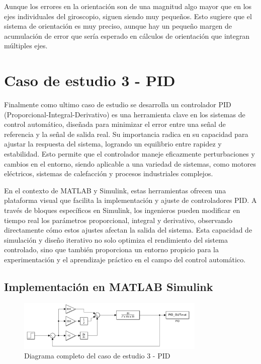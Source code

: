 Aunque los errores en la orientación son de una magnitud algo mayor que en los ejes individuales del giroscopio, siguen siendo muy pequeños. Esto sugiere que el sistema de orientación es muy preciso, aunque hay un pequeño margen de acumulación de error que sería esperado en cálculos de orientación que integran múltiples ejes. 


\section{Caso de estudio 3 - PID}

Finalmente como ultimo caso de estudio se desarrolla un controlador PID (Proporcional-Integral-Derivativo) es una herramienta clave en los sistemas de control automático, diseñada para minimizar el error entre una señal de referencia y la señal de salida real. Su importancia radica en su capacidad para ajustar la respuesta del sistema, logrando un equilibrio entre rapidez y estabilidad. Esto permite que el controlador maneje eficazmente perturbaciones y cambios en el entorno, siendo aplicable a una variedad de sistemas, como motores eléctricos, sistemas de calefacción y procesos industriales complejos.

En el contexto de MATLAB y Simulink, estas herramientas ofrecen una plataforma visual que facilita la implementación y ajuste de controladores PID. A través de bloques específicos en Simulink, los ingenieros pueden modificar en tiempo real los parámetros proporcional, integral y derivativo, observando directamente cómo estos ajustes afectan la salida del sistema. Esta capacidad de simulación y diseño iterativo no solo optimiza el rendimiento del sistema controlado, sino que también proporciona un entorno propicio para la experimentación y el aprendizaje práctico en el campo del control automático.


\subsection{Implementación en MATLAB Simulink}

\begin{figure}[h!]
    \centering
    \includegraphics[width=0.8\textwidth]{fig/Capitulo5/Caso_de_estudio_PID/PID_Diagram.pdf}
    \caption{Diagrama completo del caso de estudio 3 - PID }
    \label{fig:caso_de_estudio_3_PID}
\end{figure}


